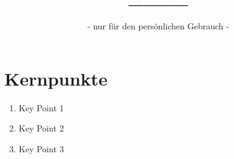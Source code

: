 \documentclass{article}
\title{____}
\subtitle{- nur für den persönlichen Gebrauch -}
\date{} %
\begin{document}
\maketitle %
\thispagestyle{fancy} %
\hypertarget{toc}{}
\vspace{-1.5}


\tableofcontents %
\listoftables
\listoffigures
\hypersetup{
  linkcolor = red!70!black,
  citecolor = black, %
  urlcolor = blue    %
}





\section*{Kernpunkte} %
\begin{enumerate}
    \item Key Point 1
    \item Key Point 2
    \item Key Point 3
\end{enumerate}


\begin{multicols}{2}



    


\end{multicols}
\vspace{20 mm} %
\printbibliography
\end{document}
